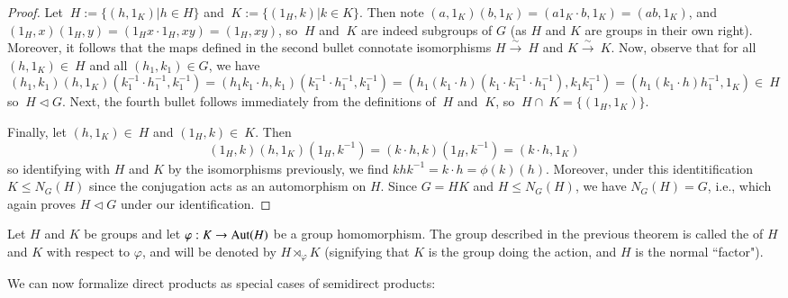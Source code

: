 \documentclass[12pt, a4paper, oneside, openright, titlepage]{book}
\begin{document}
\begin{proof}
    Let $~H := \{(h,1_K)\vert h\in H\}$ and $~K := \{(1_H,k)\vert k\in K\}$. Then note $(a,1_K)(b,1_K) = (a1_K\cdot b,1_K) = (ab,1_K)$, and $(1_H,x)(1_H,y) = (1_Hx\cdot 1_H,xy) = (1_H,xy)$, so $~H$ and $~K$ are indeed subgroups of $G$ (as $H$ and $K$ are groups in their own right). Moreover, it follows that the maps defined in the second bullet connotate isomorphisms $H\xrightarrow{\sim}~H$ and $K\xrightarrow{\sim}~K$. Now, observe that for all $(h,1_K) \in ~H$ and all $(h_1,k_1) \in G$, we have \begin{equation*}
        (h_1,k_1)(h,1_K)(k_1^{-1}\cdot h_1^{-1},k_1^{-1}) = (h_1k_1\cdot h,k_1)(k_1^{-1}\cdot h_1^{-1},k_1^{-1}) = (h_1(k_1\cdot h)(k_1\cdot k_1^{-1}\cdot h_1^{-1}),k_1k_1^{-1}) = (h_1(k_1\cdot h)h_1^{-1}, 1_K) \in ~H
    \end{equation*}
    so $~H\vartriangleleft G$. Next, the fourth bullet follows immediately from the definitions of $~H$ and $~K$, so $~H\cap ~K = \{(1_H,1_K)\}$.

    Finally, let $(h,1_K) \in ~H$ and $(1_H,k) \in ~K$. Then \begin{equation*}
        (1_H,k)(h,1_K)(1_H,k^{-1}) = (k\cdot h, k)(1_H,k^{-1}) = (k\cdot h, 1_K)
    \end{equation*}
    so identifying with $H$ and $K$ by the isomorphisms previously, we find $khk^{-1} = k\cdot h = \phi(k)(h)$. Moreover, under this identitification $K \leq N_G(H)$ since the conjugation acts as an automorphism on $H$. Since $G = HK$ and $H\leq N_G(H)$, we have $N_G(H) = G$, i.e., which again proves $H\vartriangleleft G$ under our identification.
\end{proof}


\begin{defn}
    Let $H$ and $K$ be groups and let $\varphi:K\rightarrow \operatorname{Aut}(H)$ be a group homomorphism. The group described in the previous theorem is called the  of $H$ and $K$ with respect to $\varphi$, and will be denoted by $H\rtimes_{\varphi}K$ (signifying that $K$ is the group doing the action, and $H$ is the normal ``factor").
\end{defn}

We can now formalize direct products as special cases of semidirect products:
\end{document}
